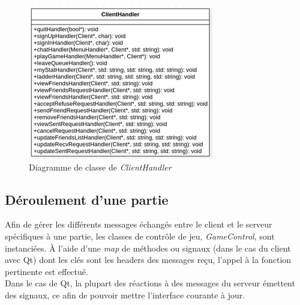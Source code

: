 \documentclass[10pt, a4paper]{article}
\begin{document}
\begin{figure}[H]
\centering
\includegraphics[scale=0.72]{diagram_clienthandler.jpg}
\caption{Diagramme de classe de \textit{ClientHandler}}
\end{figure}

\subsection{Déroulement d'une partie}

Afin de gérer les différents messages échangés entre le client et le serveur spécifiques à une partie, les classes de contrôle de jeu, \textit{GameControl}, sont instanciées. À l'aide d'une \textit{map} de méthodes ou signaux (dans le cas du client avec Qt) dont les clés sont les headers des messages reçu, l'appel à la fonction pertinente est effectué.\\
Dans le cas de Qt, la plupart des réactions à des messages du serveur émettent des signaux, ce afin de pouvoir mettre l'interface courante à jour.\\
\end{document}

